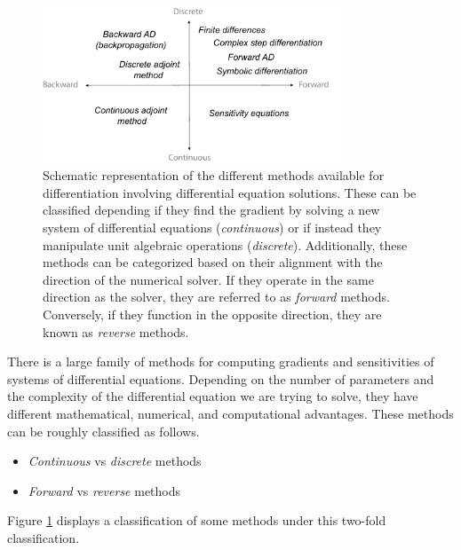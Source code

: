 \begin{figure}[t]
    \centering
    \includegraphics[width=0.80\textwidth]{figures/scheme-methods.pdf}
    \caption{Schematic representation of the different methods available for differentiation involving differential equation solutions. These can be classified depending if they find the gradient by solving a new system of differential equations (\textit{continuous}) or if instead they manipulate unit algebraic operations (\textit{discrete}). Additionally, these methods can be categorized based on their alignment with the direction of the numerical solver. If they operate in the same direction as the solver, they are referred to as \textit{forward} methods. Conversely, if they function in the opposite direction, they are known as \textit{reverse} methods.}
    \label{fig:scheme-all-methods}
\end{figure}

There is a large family of methods for computing gradients and sensitivities of systems of differential equations. 
Depending on the number of parameters and the complexity of the differential equation we are trying to solve, they have different mathematical, numerical, and computational advantages.
These methods can be roughly classified as  follows\cite{ma2021comparison}. 
\begin{itemize}
    \item \textit{Continuous} vs \textit{discrete}  methods
    \item \textit{Forward} vs \textit{reverse} methods
\end{itemize}
Figure \ref{fig:scheme-all-methods} displays a classification of some methods under this two-fold classification. 

